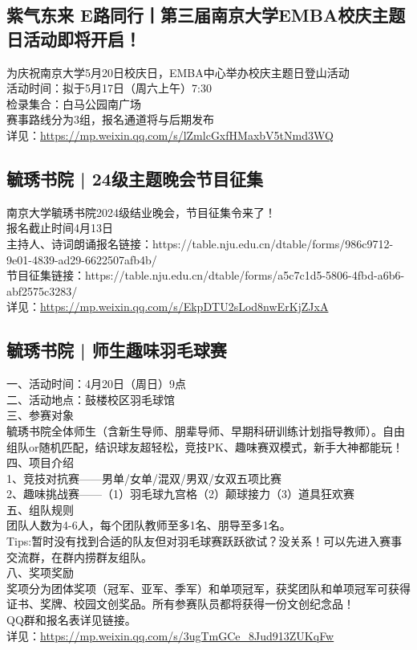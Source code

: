\documentclass[letterpaper, 12pt]{article}
\begin{document}
\begin{multicols}{2}
\subsection{紫气东来 E路同行丨第三届南京大学EMBA校庆主题日活动即将开启！}
为庆祝南京大学5月20日校庆日，EMBA中心举办校庆主题日登山活动
\\活动时间：拟于5月17日（周六上午）7:30
\\检录集合：白马公园南广场
\\赛事路线分为3组，报名通道将与后期发布
\\详见：\url{https://mp.weixin.qq.com/s/lZmlcGxfHMaxbV5tNmd3WQ}

\subsection{毓琇书院 | 24级主题晚会节目征集}
南京大学毓琇书院2024级结业晚会，节目征集令来了！
\\报名截止时间4月13日
\\主持人、诗词朗诵报名链接：https://table.nju.edu.cn/dtable/forms/986c9712-9e01-4839-ad29-6622507afb4b/
\\节目征集链接：https://table.nju.edu.cn/dtable/forms/a5c7c1d5-5806-4fbd-a6b6-abf2575c3283/
\\详见：\url{https://mp.weixin.qq.com/s/EkpDTU2sLod8nwErKjZJxA}

\subsection{毓琇书院 | 师生趣味羽毛球赛}
一、活动时间：4月20日（周日）9点
\\二、活动地点：鼓楼校区羽毛球馆
\\三、参赛对象
\\毓琇书院全体师生（含新生导师、朋辈导师、早期科研训练计划指导教师）。自由组队or随机匹配，结识球友超轻松，竞技PK、趣味赛双模式，新手大神都能玩！
\\四、项目介绍
\\1、竞技对抗赛——男单/女单/混双/男双/女双五项比赛
\\2、趣味挑战赛——（1）羽毛球九宫格（2）颠球接力（3）道具狂欢赛
\\五、组队规则
\\团队人数为4-6人，每个团队教师至多1名、朋导至多1名。
\\Tips:暂时没有找到合适的队友但对羽毛球赛跃跃欲试？没关系！可以先进入赛事交流群，在群内捞群友组队。
\\八、奖项奖励
\\奖项分为团体奖项（冠军、亚军、季军）和单项冠军，获奖团队和单项冠军可获得证书、奖牌、校园文创奖品。所有参赛队员都将获得一份文创纪念品！
\\QQ群和报名表详见链接。
\\详见：\url{https://mp.weixin.qq.com/s/3ugTmGCe_8Jud913ZUKqFw}


\end{multicols}
\end{document}
